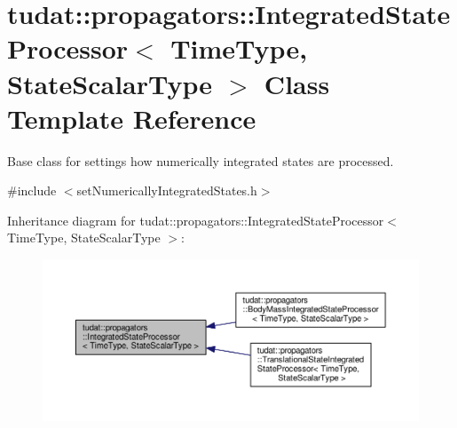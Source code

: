 \hypertarget{classtudat_1_1propagators_1_1IntegratedStateProcessor}{}\section{tudat\+:\+:propagators\+:\+:Integrated\+State\+Processor$<$ Time\+Type, State\+Scalar\+Type $>$ Class Template Reference}
\label{classtudat_1_1propagators_1_1IntegratedStateProcessor}


Base class for settings how numerically integrated states are processed.  




{\ttfamily \#include $<$set\+Numerically\+Integrated\+States.\+h$>$}



Inheritance diagram for tudat\+:\+:propagators\+:\+:Integrated\+State\+Processor$<$ Time\+Type, State\+Scalar\+Type $>$\+:
\nopagebreak
\begin{figure}[H]
\begin{center}
\leavevmode
\includegraphics[width=350pt]{classtudat_1_1propagators_1_1IntegratedStateProcessor__inherit__graph}
\end{center}
\end{figure}
